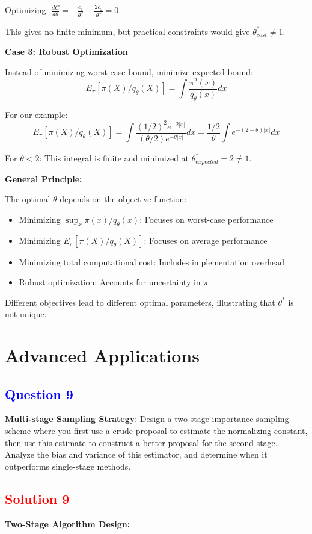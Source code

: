 \documentclass[11pt]{article}
\newcommand{\question}[1]{\subsection*{\textcolor{blue}{Question #1}}}
\newcommand{\solution}[1]{\subsection*{\textcolor{red}{Solution #1}}}
\begin{document}
Optimizing: $\frac{dC}{d\theta} = -\frac{c_1}{\theta^2} - \frac{2c_2}{\theta^3} = 0$

This gives no finite minimum, but practical constraints would give $\theta^*_{cost} \neq 1$.

\textbf{Case 3: Robust Optimization}

Instead of minimizing worst-case bound, minimize expected bound:
$$E_\pi[\pi(X)/q_\theta(X)] = \int \frac{\pi^2(x)}{q_\theta(x)}dx$$

For our example:
$$E_\pi[\pi(X)/q_\theta(X)] = \int \frac{(1/2)^2 e^{-2|x|}}{(\theta/2)e^{-\theta|x|}}dx = \frac{1/2}{\theta} \int e^{-(2-\theta)|x|}dx$$

For $\theta < 2$: This integral is finite and minimized at $\theta^*_{expected} = 2 \neq 1$.

\textbf{General Principle:}

The optimal $\theta$ depends on the objective function:
\begin{itemize}
\item Minimizing $\sup_x \pi(x)/q_\theta(x)$: Focuses on worst-case performance
\item Minimizing $E_\pi[\pi(X)/q_\theta(X)]$: Focuses on average performance  
\item Minimizing total computational cost: Includes implementation overhead
\item Robust optimization: Accounts for uncertainty in $\pi$
\end{itemize}

Different objectives lead to different optimal parameters, illustrating that $\theta^*$ is not unique.

\section{Advanced Applications}

\question{9}
\textbf{Multi-stage Sampling Strategy}: Design a two-stage importance sampling scheme where you first use a crude proposal to estimate the normalizing constant, then use this estimate to construct a better proposal for the second stage. Analyze the bias and variance of this estimator, and determine when it outperforms single-stage methods.

\solution{9}
\textbf{Two-Stage Algorithm Design:}
\end{document}
